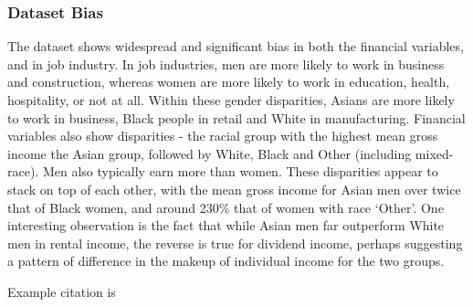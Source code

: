 \documentclass[conference]{IEEEtran}
\begin{document}
\subsubsection{Dataset Bias}
The dataset shows widespread and significant bias in both the financial variables, and in job industry. In job industries, men are more likely to work in business and construction, whereas women are more likely to work in education, health, hospitality, or not at all. Within these gender disparities, Asians are more likely to work in business, Black people in retail and White in manufacturing. Financial variables also show disparities - the racial group with the highest mean gross income the Asian group, followed by White, Black and Other (including mixed-race). Men also typically earn more than women. These disparities appear to stack on top of each other, with the mean gross income for Asian men over twice that of Black women, and around 230\% that of women with race `Other'. One interesting observation is the fact that while Asian men far outperform White men in rental income, the reverse is true for dividend income, perhaps suggesting a pattern of difference in the makeup of individual income for the two groups.

Example citation is \cite{DBLP:journals/corr/HeZRS15}



\end{document}
